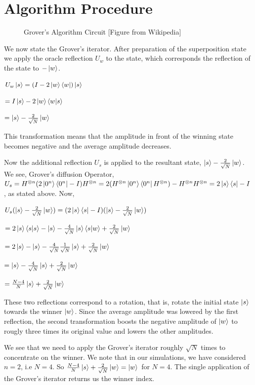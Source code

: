 \documentclass{article}
\begin{document}
\section{Algorithm Procedure}
\begin{figure}[H]
\centering 
\noindent{}%
\caption{Grover's Algorithm Circuit [Figure from Wikipedia]}
\end{figure}
We now state the Grover's iterator. After preparation of the superposition state we apply the oracle reflection $U_w$ to the state, which corresponds the reflection of the state to $-\ket{w}$.
\begin{center}
$U_w \ket{s} = (I-2\ket{w} \bra{w})\ket{s}$\par
$=I\ket{s}-2\ket{w}\braket{w|s}$\par
$=\ket{s}-{2\over{\sqrt{N}}}\ket{w}$
\end{center}
This transformation means that the amplitude in front of the winning state becomes negative and the average amplitude decreases.\par
Now the additional reflection $U_s$ is applied to the resultant state, $\ket{s}-{2\over{\sqrt{N}}}\ket{w}$. We see, Grover's diffusion Operator, $U_s=H^{\otimes n}(2\ket{0^n}\bra{0^n}-I)H^{\otimes n}=2(H^{\otimes n}\ket{0^n}\bra{0^n}H^{\otimes n})-H^{\otimes n}H^{\otimes n}=2\ket{s}\bra{s}-I$, as stated above. Now,
\begin{center}
$U_s(\ket{s}-{2\over{\sqrt{N}}}\ket{w})=(2\ket{s}\bra{s} - I)(\ket{s}-{2\over{\sqrt{N}}}\ket{w})$\par
$=2\ket{s}\braket{s|s}-\ket{s}-{4\over \sqrt{N}}\ket{s}\braket{s|w}+{2\over \sqrt{N}}\ket{w}$\par
$=2\ket{s}-\ket{s}-{4\over \sqrt{N}}{1\over \sqrt{N}}\ket{s}+{2\over \sqrt{N}}\ket{w}$\par
$=\ket{s}-{4\over \sqrt{N}}\ket{s}+{2\over \sqrt{N}}\ket{w}$\par
$={{N-4}\over N}\ket{s}+{2\over \sqrt{N}}\ket{w}$
\end{center}
These two reflections correspond to a rotation, that is, rotate the initial state $\ket{s}$ towards the winner $\ket{w}$. Since the average amplitude was lowered by the first reflection, the second transformation boosts the negative amplitude of $\ket{w}$ to rougly three times its original value and lowers the other amplitudes.\par
We see that we need to apply the Grover's iterator roughly $\sqrt{N}$ times to concentrate on the winner. We note that in our simulations, we have considered $n=2$, i.e $N=4$. So ${{N-4}\over N}\ket{s}+{2\over \sqrt{N}}\ket{w}=\ket{w}$ for $N=4$. The single application of the Grover's iterator returns us the winner index.
\end{document}
